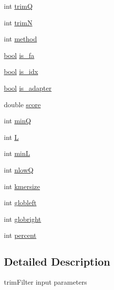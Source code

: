 \begin{DoxyCompactItemize}
\item 
int \hyperlink{struct__iparam__trimFilter_a5b5344041c9313230de07c9485227203}{trim\+Q}
\item 
int \hyperlink{struct__iparam__trimFilter_a5f2d247cc26608ed5cc9e2d6943940d7}{trim\+N}
\item 
int \hyperlink{struct__iparam__trimFilter_a0b5f9bed4a7b4e2de8c917b42360f4d3}{method}
\item 
\hyperlink{defines_8h_abb452686968e48b67397da5f97445f5b}{bool} \hyperlink{struct__iparam__trimFilter_ac6093d26e41e61f82ffd2aa05f563f9c}{is\+\_\+fa}
\item 
\hyperlink{defines_8h_abb452686968e48b67397da5f97445f5b}{bool} \hyperlink{struct__iparam__trimFilter_afc50c477a3340ed7befc430d273ff6cb}{is\+\_\+idx}
\item 
\hyperlink{defines_8h_abb452686968e48b67397da5f97445f5b}{bool} \hyperlink{struct__iparam__trimFilter_a6d015b5bf1568c362d9ca0ff37b751f8}{is\+\_\+adapter}
\item 
double \hyperlink{struct__iparam__trimFilter_a193ef2030f6eb8db0b75afbbd152d6a1}{score}
\item 
int \hyperlink{struct__iparam__trimFilter_a1e2b69f148d9299815af6ab7f575ad1a}{min\+Q}
\item 
int \hyperlink{struct__iparam__trimFilter_a72fcc236d4136d2405a04f155b515894}{L}
\item 
int \hyperlink{struct__iparam__trimFilter_ac2b43664ca0c95a8572f97254893d675}{min\+L}
\item 
int \hyperlink{struct__iparam__trimFilter_aaeab85398303eada76cb6f32841fa094}{nlow\+Q}
\item 
int \hyperlink{struct__iparam__trimFilter_a6a1118d39cdaa79f48f2d010a6018e5c}{kmersize}
\item 
int \hyperlink{struct__iparam__trimFilter_a2e626c5776d4423d20d5ec7606fe9b81}{globleft}
\item 
int \hyperlink{struct__iparam__trimFilter_ad5fb4ca1786b14cd63a8467187474f51}{globright}
\item 
int \hyperlink{struct__iparam__trimFilter_a8ed026b1de4fccc7288258c3a8faa395}{percent}
\end{DoxyCompactItemize}


\subsection{Detailed Description}
trim\+Filter input parameters 

